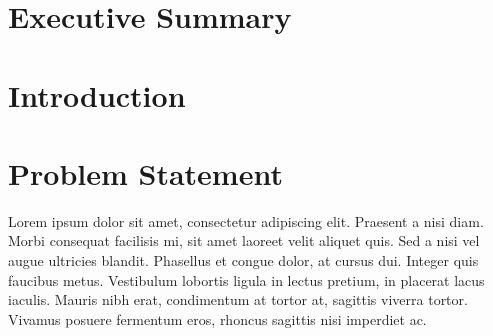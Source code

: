 \documentclass[titlepage,a4paper,12pt,thmsb]{report}
\begin{document}
{\par}


\pagebreak



\chapter*{Executive Summary}

\blindtext



\newpage
{}
\newpage

\chapter{Introduction}
\Blindtext

\chapter{Problem Statement}

Lorem ipsum dolor sit amet, consectetur adipiscing elit. Praesent a nisi diam. Morbi consequat facilisis mi, sit amet laoreet velit aliquet quis. Sed a nisi vel augue ultricies blandit. Phasellus et congue dolor, at cursus dui. Integer quis faucibus metus. Vestibulum lobortis ligula in lectus pretium, in placerat lacus iaculis. Mauris nibh erat, condimentum at tortor at, sagittis viverra tortor. Vivamus posuere fermentum eros, rhoncus sagittis nisi imperdiet ac.
\end{document}
